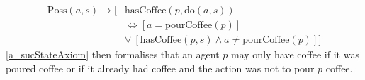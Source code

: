 \begin{equation}\label{a_sucStateAxiom}
  \begin{split}
    \mathrm{Poss}(a,s)\rightarrow \big[&\mathrm{hasCoffee}(p,\mathrm{do}(a,s))
\\    &\Leftrightarrow [a=\mathrm{pourCoffee}(p)]
\\    &\vee\ [\mathrm{hasCoffee}(p,s) \wedge a\neq \mathrm{pourCoffee}(p)]\big]
  \end{split}
\end{equation}
\autoref{a_sucStateAxiom} then formalises that an agent $p$ may only have coffee if it was poured coffee or if it already had coffee and the action was not to pour $p$ coffee.
